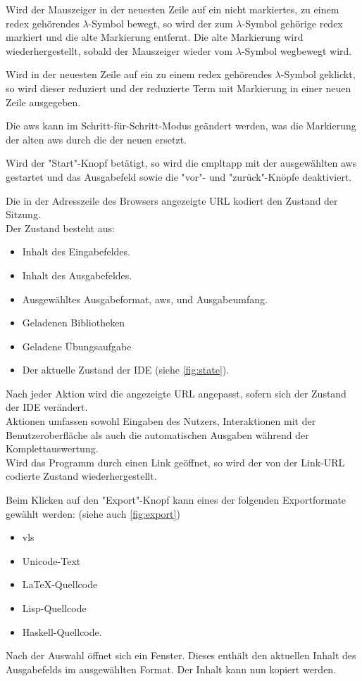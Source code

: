 \documentclass[parskip=full,11pt,twoside]{scrartcl}
\begin{document}
Wird der Mauszeiger in der neuesten Zeile auf ein nicht markiertes, zu einem \gls{redex} gehörendes $\lambda$-Symbol bewegt, so wird der zum $\lambda$-Symbol gehörige \gls{redex} markiert und die alte Markierung entfernt. Die alte Markierung wird wiederhergestellt, sobald der Mauszeiger wieder vom $\lambda$-Symbol wegbewegt wird.

Wird in der neuesten Zeile auf ein zu einem \gls{redex} gehörendes $\lambda$-Symbol geklickt, so wird dieser reduziert und der reduzierte Term mit Markierung in einer neuen Zeile ausgegeben.

Die \gls{aws} kann im Schritt-für-Schritt-Modus geändert werden, was die Markierung der alten \gls{aws} durch die der neuen ersetzt.

Wird der "Start"-Knopf betätigt, so wird die \gls{cmpltapp} mit der ausgewählten \gls{aws} gestartet und das Ausgabefeld sowie die "vor"- und "zurück"-Knöpfe deaktiviert.

Die in der Adresszeile des Browsers angezeigte URL kodiert den Zustand der Sitzung.\\
Der Zustand besteht aus:
\begin{itemize}
	\item Inhalt des Eingabefeldes.
	\item Inhalt des Ausgabefeldes.
	\item Ausgewähltes Ausgabeformat, \gls{aws}, und Ausgabeumfang.
	\item Geladenen Bibliotheken
	\item Geladene Übungsaufgabe
	\item Der aktuelle Zustand der IDE (siehe \cref{fig:state}).
\end{itemize}
Nach jeder Aktion wird die angezeigte URL angepasst, sofern sich der Zustand der IDE verändert.\\
Aktionen umfassen sowohl Eingaben des Nutzers, Interaktionen mit der Benutzeroberfläche als auch die automatischen Ausgaben während der Komplettauswertung.\\ 
Wird das Programm durch einen Link geöffnet, so wird der von der Link-URL codierte Zustand wiederhergestellt.

Beim Klicken auf den "Export"-Knopf kann eines der folgenden Exportformate gewählt werden: (siehe auch \cref{fig:export})
\begin{itemize}
	\item \gls{vls}
	\item Unicode-Text
	\item \LaTeX-Quellcode
	\item Lisp-Quellcode
	\item Haskell-Quellcode.
\end{itemize}
Nach der Auswahl öffnet sich ein Fenster.
Dieses enthält den aktuellen Inhalt des Ausgabefelds im ausgewählten Format.
Der Inhalt kann nun kopiert werden.
\end{document}

